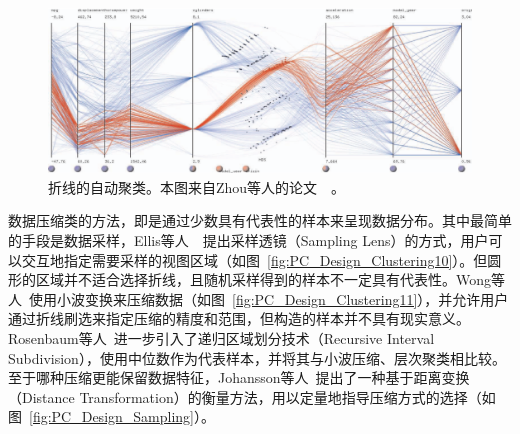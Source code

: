 \documentclass[12pt,twocolumn]{article}
\begin{document}
\begin{figure}[!htb]
\centering
\includegraphics[width=0.88\linewidth]{images/PC_Design_Clustering12.eps}
\caption{\label{fig:PC_Design_Clustering9}折线的自动聚类。本图来自Zhou等人的论文~\citep{zhou2008visual}~。
}
\end{figure}

数据压缩类的方法，即是通过少数具有代表性的样本来呈现数据分布。其中最简单的手段是数据采样，Ellis等人~\citep{ellis2005sampling}~\citep{ellis2006enabling}提出采样透镜（Sampling Lens）的方式，用户可以交互地指定需要采样的视图区域（如图~\ref{fig:PC_Design_Clustering10}）。但圆形的区域并不适合选择折线，且随机采样得到的样本不一定具有代表性。Wong等人~\citep{wong1996multiresolution}使用小波变换来压缩数据（如图~\ref{fig:PC_Design_Clustering11}），并允许用户通过折线刷选来指定压缩的精度和范围，但构造的样本并不具有现实意义。Rosenbaum等人~\citep{rosenbaum2012progressive}进一步引入了递归区域划分技术（Recursive Interval Subdivision），使用中位数作为代表样本，并将其与小波压缩、层次聚类相比较。至于哪种压缩更能保留数据特征，Johansson等人~\citep{johansson2008screen}提出了一种基于距离变换（Distance Transformation）的衡量方法，用以定量地指导压缩方式的选择（如图~\ref{fig:PC_Design_Sampling}）。
\end{document}
